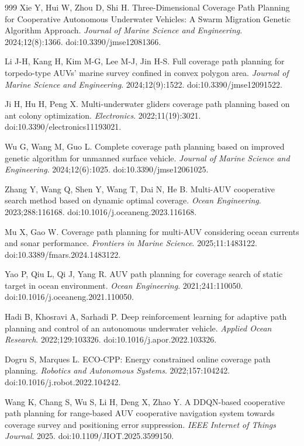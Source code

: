 \documentclass[jmse,article,submit,moreauthors]{Definitions/mdpi}
\begin{document}
\begin{thebibliography}{999}
Xie Y, Hui W, Zhou D, Shi H. Three-Dimensional Coverage Path Planning for Cooperative Autonomous Underwater Vehicles: A Swarm Migration Genetic Algorithm Approach. \textit{Journal of Marine Science and Engineering}. 2024;12(8):1366. doi:10.3390/jmse12081366.

Li J-H, Kang H, Kim M-G, Lee M-J, Jin H-S. Full coverage path planning for torpedo-type AUVs' marine survey confined in convex polygon area. \textit{Journal of Marine Science and Engineering}. 2024;12(9):1522. doi:10.3390/jmse12091522.

Ji H, Hu H, Peng X. Multi-underwater gliders coverage path planning based on ant colony optimization. \textit{Electronics}. 2022;11(19):3021. doi:10.3390/electronics11193021.

Wu G, Wang M, Guo L. Complete coverage path planning based on improved genetic algorithm for unmanned surface vehicle. \textit{Journal of Marine Science and Engineering}. 2024;12(6):1025. doi:10.3390/jmse12061025.

Zhang Y, Wang Q, Shen Y, Wang T, Dai N, He B. Multi-AUV cooperative search method based on dynamic optimal coverage. \textit{Ocean Engineering}. 2023;288:116168. doi:10.1016/j.oceaneng.2023.116168.

Mu X, Gao W. Coverage path planning for multi-AUV considering ocean currents and sonar performance. \textit{Frontiers in Marine Science}. 2025;11:1483122. doi:10.3389/fmars.2024.1483122.

Yao P, Qiu L, Qi J, Yang R. AUV path planning for coverage search of static target in ocean environment. \textit{Ocean Engineering}. 2021;241:110050. doi:10.1016/j.oceaneng.2021.110050.

Hadi B, Khosravi A, Sarhadi P. Deep reinforcement learning for adaptive path planning and control of an autonomous underwater vehicle. \textit{Applied Ocean Research}. 2022;129:103326. doi:10.1016/j.apor.2022.103326.

Dogru S, Marques L. ECO-CPP: Energy constrained online coverage path planning. \textit{Robotics and Autonomous Systems}. 2022;157:104242. doi:10.1016/j.robot.2022.104242.

Wang K, Chang S, Wu S, Li H, Deng X, Zhao Y. A DDQN-based cooperative path planning for range-based AUV cooperative navigation system towards coverage survey and positioning error suppression. \textit{IEEE Internet of Things Journal}. 2025. doi:10.1109/JIOT.2025.3599150.


\end{thebibliography}
\end{document}
